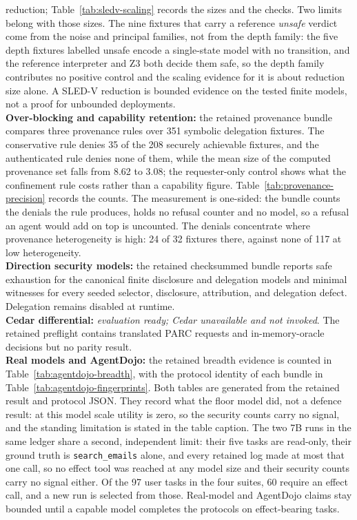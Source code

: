 \documentclass[11pt]{article}
\begin{document}
reduction; Table~\ref{tab:sledv-scaling} records the sizes and the checks. Two
limits belong with those sizes. The nine fixtures that carry a reference
\emph{unsafe} verdict come from the noise and principal families, not from the
depth family: the five depth fixtures labelled unsafe encode a single-state
model with no transition, and the reference interpreter and Z3 both decide them
safe, so the depth family contributes no positive control and the scaling
evidence for it is about reduction size alone. A SLED-V reduction is bounded
evidence on the tested finite models, not a proof for unbounded deployments.\\
\textbf{Over-blocking and capability retention:} the retained provenance
bundle compares three provenance rules over 351 symbolic delegation fixtures.
The conservative rule denies 35 of the 208 securely achievable fixtures, and the
authenticated rule denies none of them, while the mean size of the computed
provenance set falls from 8.62 to 3.08; the requester-only control shows what
the confinement rule costs rather than a capability figure.
Table~\ref{tab:provenance-precision} records the counts. The measurement is
one-sided: the bundle counts the denials the rule produces, holds no refusal
counter and no model, so a refusal an agent would add on top is uncounted. The
denials concentrate where provenance heterogeneity is high: 24 of 32 fixtures
there, against none of 117 at low heterogeneity.\\
\textbf{Direction security models:} the retained checksummed bundle reports
safe exhaustion for the canonical finite disclosure and delegation models and
minimal witnesses for every seeded selector, disclosure, attribution, and
delegation defect. Delegation remains disabled at runtime.\\
\textbf{Cedar differential:} \emph{evaluation ready; Cedar unavailable and not
invoked}. The retained preflight contains translated PARC requests and
in-memory-oracle decisions but no parity result.\\
\textbf{Real models and AgentDojo:} the retained breadth evidence is counted in
Table~\ref{tab:agentdojo-breadth}, with the protocol identity of each bundle in
Table~\ref{tab:agentdojo-fingerprints}. Both tables are generated from the
retained result and protocol JSON. They record what the floor model did, not a
defence result: at this model scale utility is zero, so the security counts
carry no signal, and the standing limitation is stated in the table caption.
The two 7B runs in the same ledger share a second, independent limit: their five
tasks are read-only, their ground truth is \texttt{search\_emails} alone, and
every retained log made at most that one call, so no effect tool was reached at
any model size and their security counts carry no signal either. Of the 97 user
tasks in the four suites, 60 require an effect call, and a new run is selected
from those. Real-model and AgentDojo claims stay bounded until a capable model
completes the protocols on effect-bearing tasks.
\end{document}
